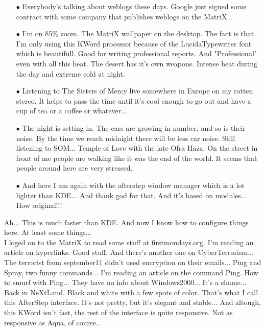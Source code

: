 \documentclass[11pt,twoside,a4paper]{book}
\begin{document}
\begin{multicols*}{2}
\begin{itemize}
	\item[$\bullet$] Everybody's talking about weblogs these days. Google just signed some contract with some company that publishes weblogs on the MatriX...
	\item[$\bullet$] I'm on 85\% zoom. The MatriX wallpaper on the desktop. The fact is that I'm only using this KWord processor because of the LucidaTypewriter font which is beautifull. Good for writing professional reports. And "Professional" even with all this heat. The desert has it's own weapons. Intense heat during the day and extreme cold at night.
	\item[$\bullet$] Listening to The Sisters of Mercy live somewhere in Europe on my rotten stereo. It helps to pass the time until it's cool enough to go out and have a cup of tea or a coffee or whatever...
	\item[$\bullet$] The night is setting in. The cars are growing in number, and so is their noise. By the time we reach midnight there will be less car noise. Still listening to SOM... Temple of Love with the late Ofra Haza. On the street in front of me people are walking like it was the end of the world. It seems that people around here are very stressed.
	\item[$\bullet$] And here I am again with the afterstep window manager which is a lot lighter than KDE... And thank god for that. And it's based on modules... How original!!!
\end{itemize} %

Ah... This is much faster than KDE. And now I know how to configure things here. At least some things... ~\\

I loged on to the MatriX to read some stuff at firstmondays.org. I'm reading an article on hyperlinks. Good stuff. And there's another one on CyberTerrorism... The terrorist from september11 didn't used encryption on their emails... Ping and Spray, two funny commands... I'm reading an article on the command Ping. How to smurf with Ping... They have no info about Windows2000... It's a shame... ~\\

Back in NeXtLand. Black and white with a few spots of color. That's what I call this AfterStep interface. It's not pretty, but it's elegant and stable... And altough, this KWord isn't fast, the rest of the interface is quite responsive. Not as responsive as Aqua, of course... ~\\


\end{multicols*}
\end{document}
